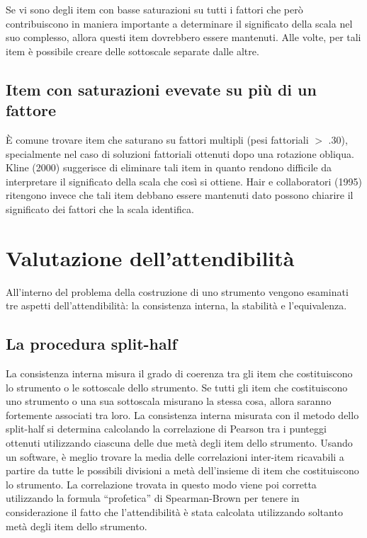 \documentclass[
  11pt,
]{krantz}
\theoremstyle{definition}
\theoremstyle{definition}
\theoremstyle{definition}
\theoremstyle{definition}
\theoremstyle{remark}
\begin{document}
Se vi sono degli item con basse saturazioni su tutti i fattori che però contribuiscono in maniera importante a determinare il significato della scala nel suo complesso, allora questi item dovrebbero essere mantenuti. Alle volte, per tali item è possibile creare delle sottoscale separate dalle altre.

\hypertarget{item-con-saturazioni-evevate-su-piuxf9-di-un-fattore}{%
\subsection{Item con saturazioni evevate su più di un fattore}\label{item-con-saturazioni-evevate-su-piuxf9-di-un-fattore}}

È comune trovare item che saturano su fattori multipli (pesi fattoriali \(>\) .30), specialmente nel caso di soluzioni fattoriali ottenuti dopo una rotazione obliqua. Kline (2000) suggerisce di eliminare tali item in quanto rendono difficile da interpretare il significato della scala che così si ottiene. Hair e collaboratori (1995) ritengono invece che tali item debbano essere mantenuti dato possono chiarire il significato dei fattori che la scala identifica.

\hypertarget{valutazione-dellattendibilituxe0}{%
\section{Valutazione dell'attendibilità}\label{valutazione-dellattendibilituxe0}}

All'interno del problema della costruzione di uno strumento vengono esaminati tre aspetti dell'attendibilità: la consistenza interna, la stabilità e l'equivalenza.

\hypertarget{la-procedura-split-half}{%
\subsection{La procedura split-half}\label{la-procedura-split-half}}

La consistenza interna misura il grado di coerenza tra gli item che costituiscono lo strumento o le sottoscale dello strumento. Se tutti gli item che costituiscono uno strumento o una sua sottoscala misurano la stessa cosa, allora saranno fortemente associati tra loro. La consistenza interna misurata con il metodo dello split-half si determina calcolando la correlazione di Pearson tra i punteggi ottenuti utilizzando ciascuna delle due metà degli item dello strumento. Usando un software, è meglio trovare la media delle correlazioni inter-item ricavabili a partire da tutte le possibili divisioni a metà dell'insieme di item che costituiscono lo strumento. La correlazione trovata in questo modo viene poi corretta utilizzando la formula ``profetica'' di Spearman-Brown per tenere in considerazione il fatto che l'attendibilità è stata calcolata utilizzando soltanto metà degli item dello strumento.
\end{document}
